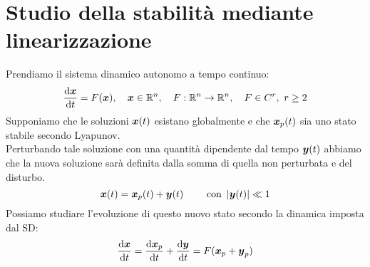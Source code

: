 \section{Studio della stabilità mediante linearizzazione}%
\label{sub:Studio della stabilità mediante linearizzazione per SD a tempo continuo autonomo}
Prendiamo il sistema dinamico autonomo a tempo continuo:
\[
    \frac{\text{d} \boldsymbol{x}}{\text{d} t} = F(\boldsymbol{x}),  \quad \boldsymbol{x}\in \mathbb{R}^n, \quad F:\mathbb{R}^n\to \mathbb{R}^n, \quad F \in C^r,\ r\ge 2
\] 
Supponiamo che le soluzioni $\boldsymbol{x}(t)$ esistano globalmente e che $\boldsymbol{x}_p(t)$ sia uno stato stabile secondo Lyapunov.\\
Perturbando tale soluzione con una quantità dipendente dal tempo $\boldsymbol{y}(t)$ abbiamo che la nuova soluzione sarà definita dalla somma di quella non perturbata e del disturbo.
\[
    \boldsymbol{x}(t) =\boldsymbol{x}_p(t)+\boldsymbol{y} (t) \qquad \text{ con } \left|\boldsymbol{y} (t)\right|\ll 1
\] 
Possiamo studiare l'evoluzione di questo nuovo stato secondo la dinamica imposta dal SD:
\[
    \frac{\text{d} \boldsymbol{x}}{\text{d} t} = \frac{\text{d} \boldsymbol{x}_p}{\text{d} t} + \frac{\text{d} \boldsymbol{y}}{\text{d} t} = F(\boldsymbol{x}_p + \boldsymbol{y}_p)
\] 
